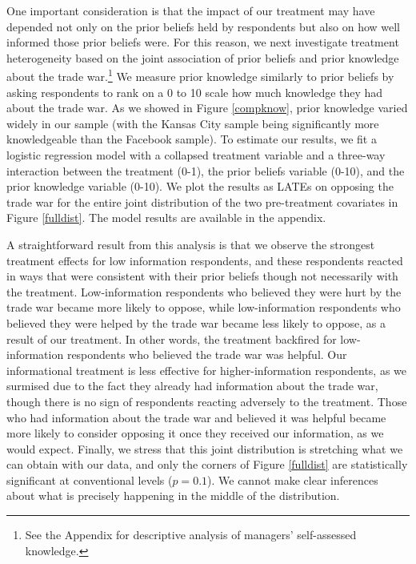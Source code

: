 \documentclass{article}
\begin{document}
One important consideration is that the impact of our treatment may have depended not only on the prior beliefs held by respondents but also on how well informed those prior beliefs were. For this reason, we next investigate treatment heterogeneity based on the joint association of prior beliefs and prior knowledge about the trade war.\footnote{See the Appendix for descriptive analysis of managers' self-assessed knowledge.} We measure prior knowledge similarly to prior beliefs by asking respondents to rank on a 0 to 10 scale how much knowledge they had about the trade war. As we showed in Figure \ref{compknow}, prior knowledge varied widely in our sample (with the Kansas City sample being significantly more knowledgeable than the Facebook sample). To estimate our results, we fit a logistic regression model with a collapsed treatment variable and a three-way interaction between the treatment (0-1), the prior beliefs variable (0-10), and the prior knowledge variable (0-10). We plot the results as LATEs on opposing the trade war for the entire joint distribution of the two pre-treatment covariates in Figure \ref{fulldist}. The model results are available in the appendix. 

A straightforward result from this analysis is that we observe the strongest treatment effects for low information respondents, and these respondents reacted in ways that were consistent with their prior beliefs though not necessarily with the treatment. Low-information respondents who believed they were hurt by the trade war became more likely to oppose, while low-information respondents who believed they were helped by the trade war became less likely to oppose, as a result of our treatment. In other words, the treatment backfired for low-information respondents who believed the trade war was helpful. Our informational treatment is less effective for higher-information respondents, as we surmised due to the fact they already had information about the trade war, though there is no sign of respondents reacting adversely to the treatment. Those who had information about the trade war and believed it was helpful became more likely to consider opposing it once they received our information, as we would expect. Finally, we stress that this joint distribution is stretching what we can obtain with our data, and only the corners of Figure \ref{fulldist} are statistically significant at conventional levels ($p=0.1$). We cannot make clear inferences about what is precisely happening in the middle of the distribution.
\end{document}

